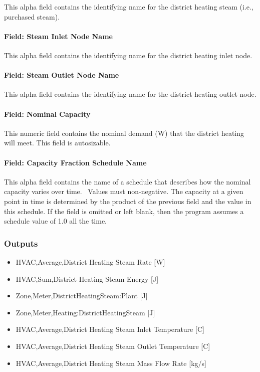 This alpha field contains the identifying name for the district heating steam (i.e., purchased steam).

\paragraph{Field: Steam Inlet Node Name}\label{field-steam-inlet-node-name-2}

This alpha field contains the identifying name for the district heating inlet node.

\paragraph{Field: Steam Outlet Node Name}\label{field-steam-outlet-node-name-2}

This alpha field contains the identifying name for the district heating outlet node.

\paragraph{Field: Nominal Capacity}\label{field-nominal-capacity-12}

This numeric field contains the nominal demand (W) that the district heating will meet. This field is autosizable.

\paragraph{Field: Capacity Fraction Schedule Name}\label{field-capacity-fraction-schedule-name-2}

This alpha field contains the name of a schedule that describes how the nominal capacity varies over time.~ Values must non-negative. The capacity at a given point in time is determined by the product of the previous field and the value in this schedule. If the field is omitted or left blank, then the program assumes a schedule value of 1.0 all the time.

\subsubsection{Outputs}\label{outputs-15-003}

\begin{itemize}
    \item
    HVAC,Average,District Heating Steam Rate {[}W{]}
    \item
    HVAC,Sum,District Heating Steam Energy {[}J{]}
    \item
    Zone,Meter,DistrictHeatingSteam:Plant {[}J{]}
    \item
    Zone,Meter,Heating:DistrictHeatingSteam {[}J{]}
    \item
    HVAC,Average,District Heating Steam Inlet Temperature {[}C{]}
    \item
    HVAC,Average,District Heating Steam Outlet Temperature {[}C{]}
    \item
    HVAC,Average,District Heating Steam Mass Flow Rate {[}kg/s{]}
\end{itemize}

